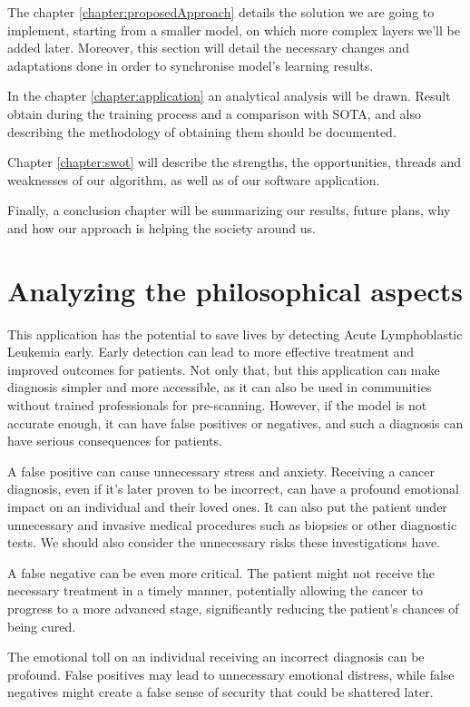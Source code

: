 \documentclass[runningheads,a4paper,11pt]{report}
\begin{document}
The chapter \ref{chapter:proposedApproach} details the solution we are going to implement, starting from a smaller model, on which more complex layers we'll be added later. Moreover, this section will detail the necessary changes and adaptations done in order to synchronise model's learning results.

In the chapter \ref{chapter:application} an analytical analysis will be drawn. Result obtain during the training process and a comparison with SOTA, and also describing the methodology of obtaining them should be documented.

Chapter \ref{chapter:swot} will describe the strengths, the opportunities, threads and weaknesses of our algorithm, as well as of our software application.

Finally, a conclusion chapter will be summarizing our results, future plans, why and how our approach is helping the society around us.

\section{Analyzing the philosophical aspects}
\label{section:philosophicalAspects}

This application has the potential to save lives by detecting Acute Lymphoblastic Leukemia early. Early detection can lead to more effective treatment and improved outcomes for patients. Not only that, but this application can make diagnosis simpler and more accessible, as it can also be used in communities without trained professionals for pre-scanning. However, if the model is not accurate enough, it can have false positives or negatives, and such a diagnosis can have serious consequences for patients.

A false positive can cause unnecessary stress and anxiety. Receiving a cancer diagnosis, even if it's later proven to be incorrect, can have a profound emotional impact on an individual and their loved ones. It can also put the patient under unnecessary and invasive medical procedures such as biopsies or other diagnostic tests. We should also consider the unnecessary risks these investigations have. 

A false negative  can be even more critical. The patient might not receive the necessary treatment in a timely manner, potentially allowing the cancer to progress to a more advanced stage, significantly reducing the patient's chances of being cured.

The emotional toll on an individual receiving an incorrect diagnosis can be profound. False positives may lead to unnecessary emotional distress, while false negatives might create a false sense of security that could be shattered later.
\end{document}
